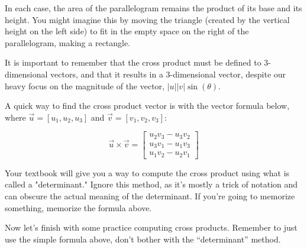 \documentclass{ximera}
\begin{document}
\begin{center}
\end{center}

In each case, the area of the parallelogram remains the product of its base and its height. You might imagine this by moving the triangle (created by the vertical height on the left side) to fit in the empty space on the right of the parallelogram, making a rectangle.

It is important to remember that the cross product must be defined to 3-dimensional vectors, and that it results in a 3-dimensional vector, despite our heavy focus on the magnitude of the vector, $|u||v|\sin(\theta)$.

\begin{definition}
    A quick way to find the cross product vector is with the vector formula below, where $\vec{u}=[u_1,u_2,u_3]$ and $\vec{v}=[v_1,v_2,v_3]$: 

    \[\vec{u}\times \vec{v} = 
    \begin{bmatrix}
    u_2 v_3 - u_3 v_2 \\
    u_3 v_1 - u_1 v_3 \\
    u_1 v_2 - u_2 v_1
    \end{bmatrix}\]
\end{definition}

\begin{remark}
Your textbook will give you a way to compute the cross product using what is called a "determinant." Ignore this method, as it's mostly a trick of notation and can obscure the actual meaning of the determinant. If you're going to memorize something, memorize the formula above.
\end{remark}

Now let's finish with some practice computing cross products. Remember to just use the simple formula above, don't bother with the ``determinant'' method.
\end{document}
